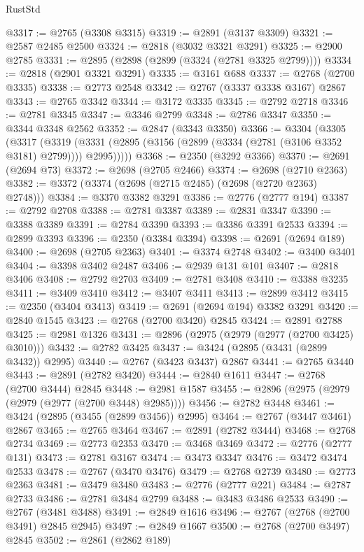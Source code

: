 \begin{lexlean}{RustStd}
\begin{coremodule}
@3317 := @2765 (@3308 @3315)
@3319 := @2891 (@3137 @3309)
@3321 := @2587 @2485 @2500
@3324 := @2818 (@3032 @3321 @3291)
@3325 := @2900 @2785
@3331 := @2895 (@2898 (@2899 (@3324 (@2781 @3325 @2799))))
@3334 := @2818 (@2901 @3321 @3291)
@3335 := @3161 @688
@3337 := @2768 (@2700 @3335)
@3338 := @2773 @2548
@3342 := @2767 (@3337 @3338 @3167) @2867
@3343 := @2765 @3342
@3344 := @3172 @3335
@3345 := @2792 @2718
@3346 := @2781 @3345
@3347 := @3346 @2799
@3348 := @2786 @3347
@3350 := @3344 @3348 @2562
@3352 := @2847 (@3343 @3350)
@3366 := @3304
    (@3305
      (@3317
        (@3319 (@3331 (@2895 (@3156 (@2899 (@3334 (@2781 (@3106 @3352 @3181) @2799)))) @2995)))))
@3368 := @2350 (@3292 @3366)
@3370 := @2691 (@2694 @73)
@3372 := @2698 (@2705 @2466)
@3374 := @2698 (@2710 @2363)
@3382 := @3372 (@3374 (@2698 (@2715 @2485) (@2698 (@2720 @2363) @2748)))
@3384 := @3370 @3382 @3291
@3386 := @2776 (@2777 @194)
@3387 := @2792 @2708
@3388 := @2781 @3387
@3389 := @2831 @3347
@3390 := @3388 @3389
@3391 := @2784 @3390
@3393 := @3386 @3391 @2533
@3394 := @2899 @3393
@3396 := @2350 (@3384 @3394)
@3398 := @2691 (@2694 @189)
@3400 := @2698 (@2705 @2363)
@3401 := @3374 @2748
@3402 := @3400 @3401
@3404 := @3398 @3402 @2487
@3406 := @2939 @131 @101
@3407 := @2818 @3406
@3408 := @2792 @2703
@3409 := @2781 @3408
@3410 := @3388 @3235
@3411 := @3409 @3410
@3412 := @3407 @3411
@3413 := @2899 @3412
@3415 := @2350 (@3404 @3413)
@3419 := @2691 (@2694 @194) @3382 @3291
@3420 := @2840 @1545
@3423 := @2768 (@2700 @3420) @2845
@3424 := @2891 @2788
@3425 := @2981 @1326
@3431 := @2896 (@2975 (@2979 (@2977 (@2700 @3425) @3010)))
@3432 := @2782 @3425
@3437 := @3424 (@2895 (@3431 (@2899 @3432)) @2995)
@3440 := @2767 (@3423 @3437) @2867
@3441 := @2765 @3440
@3443 := @2891 (@2782 @3420)
@3444 := @2840 @1611
@3447 := @2768 (@2700 @3444) @2845
@3448 := @2981 @1587
@3455 := @2896 (@2975 (@2979 (@2979 (@2977 (@2700 @3448) @2985))))
@3456 := @2782 @3448
@3461 := @3424 (@2895 (@3455 (@2899 @3456)) @2995)
@3464 := @2767 (@3447 @3461) @2867
@3465 := @2765 @3464
@3467 := @2891 (@2782 @3444)
@3468 := @2768 @2734
@3469 := @2773 @2353
@3470 := @3468 @3469
@3472 := @2776 (@2777 @131)
@3473 := @2781 @3167
@3474 := @3473 @3347
@3476 := @3472 @3474 @2533
@3478 := @2767 (@3470 @3476)
@3479 := @2768 @2739
@3480 := @2773 @2363
@3481 := @3479 @3480
@3483 := @2776 (@2777 @221)
@3484 := @2787 @2733
@3486 := @2781 @3484 @2799
@3488 := @3483 @3486 @2533
@3490 := @2767 (@3481 @3488)
@3491 := @2849 @1616
@3496 := @2767 (@2768 (@2700 @3491) @2845 @2945)
@3497 := @2849 @1667
@3500 := @2768 (@2700 @3497) @2845
@3502 := @2861 (@2862 @189)

\end{coremodule}
\end{lexlean}
